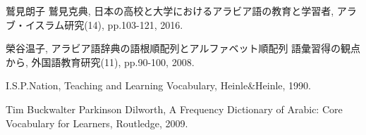 \documentclass[technicalreport]{ieicej}
\begin{document}
\begin{thebibliography}{99}
鷲見朗子 鷲見克典, 日本の高校と大学におけるアラビア語の教育と学習者, アラブ・イスラム研究(14), pp.103-121, 2016.

榮谷温子, アラビア語辞典の語根順配列とアルファベット順配列 語彙習得の観点から, 外国語教育研究(11), pp.90-100, 2008.

I.S.P.Nation, Teaching and Learning Vocabulary, Heinle\&Heinle, 1990. 

Tim Buckwalter  Parkinson Dilworth, A Frequency Dictionary of Arabic: Core Vocabulary for Learners, Routledge, 2009.

\end{thebibliography}
\end{document}
